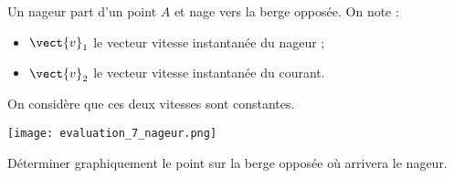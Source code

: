 \documentclass[a4paper,dvipsnames]{article}
\begin{document}
\begin{multicols}{2}
\begin{enumerate}
  \end{enumerate}
\end{multicols} 

\bigskip

\exo[2 points] Un nageur part d'un point $A$ et nage vers la berge opposée. On note :
\begin{itemize}
  \item $\vect{v}_1$ le vecteur vitesse instantanée du nageur ;
  \item $\vect{v}_2$ le vecteur vitesse instantanée du courant.
\end{itemize}
On considère que ces deux vitesses sont constantes.

\begin{center}
  \texttt{[image: evaluation\_7\_nageur.png]}  
\end{center}

Déterminer graphiquement le point sur la berge opposée où arrivera le nageur.
\end{document}
